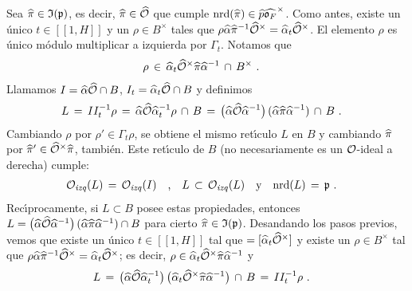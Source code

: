 Sea $\hhat\pi\in\frak I(\frak p)$, es decir, $\hhat\pi\in\Adfin{\cal O}$ que
cumple $\nrd(\hhat\pi)\in\hhat p\Idfin{\oka F}$. Como antes, existe un
\'{u}nico $t\in [\![1,H]\!]$ y un $\rho\in B^\times$ tales que
$\rho\hhat\alpha\hhat\pi^{-1}\Idfin{\cal O}=\hhat\alpha_t\Idfin{\cal O}$. El
elemento $\rho$ es \'{u}nico m\'{o}dulo multiplicar a izquierda por
$\Gamma_t$. Notamos que
\begin{align*}
	\rho & \,\in\,\hhat\alpha_t\Idfin{\cal O}\hhat\pi\hhat\alpha^{-1}
		\,\cap\,B^\times
	\text{ .}
\end{align*}
%
Llamamos $I=\hhat\alpha\Adfin{\cal O}\cap B$,
$I_t=\hhat\alpha_t\Adfin{\cal O}\cap B$ y definimos
\begin{align*}
	L & \,=\,II_t^{-1}\rho \,=\,
		\hhat\alpha\Adfin{\cal O}\hhat\alpha_t^{-1}\rho\,\cap\,B \,=\,
		\big(\hhat\alpha\Adfin{\cal O}\hhat\alpha^{-1}\big)\,
			(\hhat\alpha\hhat\pi\hhat\alpha^{-1})\,\cap\,B
	\text{ .}
\end{align*}
%
Cambiando $\rho$ por $\rho'\in\Gamma_t\rho$, se obtiene el mismo ret\'{\i}culo
$L$ en $B$ y cambiando $\hhat\pi$ por $\hhat\pi'\in\Idfin{\cal O}\hhat\pi$,
tambi\'{e}n. Este ret\'{\i}culo de $B$ (no necesariamente es un $\cal O$-ideal
a derecha) cumple:
\begin{align*}
	\Oizq(L)\,=\,\Oizq(I) & \quad\text{,}\quad
		L\,\subset\,\Oizq(L) \quad\text{y}\quad
		\nrd(L)\,=\,\frak p
	\text{ .}
\end{align*}
%
Rec\'{\i}procamente, si $L\subset B$ posee estas propiedades, entonces
\begin{math}
	L=\big(\hhat\alpha\Adfin{\cal O}\hhat\alpha^{-1}\big)\,
		(\hhat\alpha\hhat\pi\hhat\alpha^{-1})\cap B
\end{math} para cierto $\hhat\pi\in\frak I(\frak p)$. Desandando los pasos
previos, vemos que existe un \'{u}nico $t\in[\![1,H]\!]$ tal que
\begin{math}
	[\hhat\alpha\hhat\pi^{-1}\Idfin{\cal O}]=
		[\hhat\alpha_t\Idfin{\cal O}]
\end{math} y existe un $\rho\in B^\times$ tal que
\begin{math}
	\rho\hhat\alpha\hhat\pi^{-1}\Idfin{\cal O}=
		\hhat\alpha_t\Idfin{\cal O}
\end{math}; es decir,
\begin{math}
	\rho\in\hhat\alpha_t\Idfin{\cal O}\hhat\pi\hhat\alpha^{-1}
\end{math} y
\begin{align*}
	L & \,=\,\big(\hhat\alpha\Adfin{\cal O}\hhat\alpha_t^{-1}\big)\,
		\big(\hhat\alpha_t\Idfin{\cal O}\hhat\pi\hhat\alpha^{-1}\big)
		\,\cap\,B \,=\,II_t^{-1}\rho
	\text{ .}
\end{align*}
%

